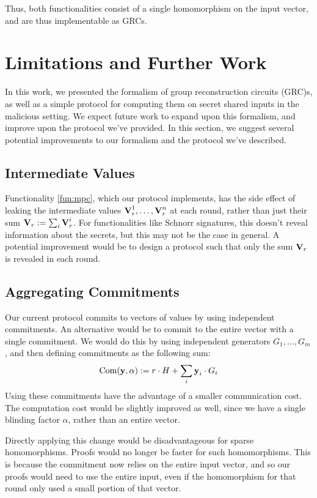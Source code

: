 Thus, both functionalities consist of a single homomorphism
on the input vector, and are thus implementable as GRCs.

\section{Limitations and Further Work}

In this work, we presented the formalism
of group reconstruction circuits (GRC)s, as well as a simple
protocol for computing them on secret shared inputs in the
malicious setting.
We expect future work to expand upon this formalism,
and improve upon the protocol we've provided.
In this section, we suggest several potential improvements
to our formalism and the protocol we've described.

\subsection{Intermediate Values}

Functionality \ref{fun:mpc}, which our protocol implements,
has the side effect of leaking the intermediate values
$\textbf{V}^1_r, \ldots, \textbf{V}^n_r$ at each round,
rather than just their sum $\textbf{V}_r := \sum_i \textbf{V}^i_r$.
For functionalities like Schnorr signatures, this doesn't
reveal information about the secrets,
but this may not be the case in general.
A potential improvement would be to design a protocol
such that only the sum $\textbf{V}_r$ is revealed in each round.

\subsection{Aggregating Commitments}

Our current protocol commits to vectors of values by using
independent commitments.
An alternative would be to commit to the entire vector
with a single commitment.
We would do this by using independent generators $G_1, \ldots, G_m$,
and then defining commitments as the following sum:
$$
\text{Com}(\textbf{y}, \alpha) := r\cdot H + \sum_i \textbf{y}_i \cdot G_i
$$
Using these commitments have the advantage of a smaller communication cost.
The computation cost would be slightly improved as well, since we have a single
blinding factor $\alpha$, rather than an entire vector.

Directly applying this change would be disadvantageous for sparse homomorphisms.
Proofs would no longer be faster for such homomorphisms.
This is because
the commitment now relies on the entire input vector, and so
our proofs would need to use the entire input,
even if the homomorphism for that round only used a small portion of that vector. 


